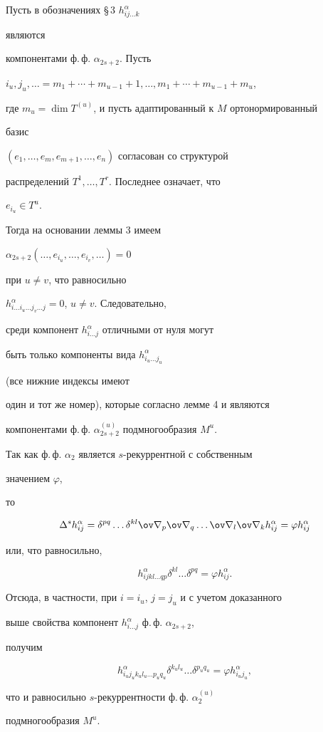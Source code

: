\begin{pf} Пусть в обозначениях \S\,3\; $h^\alpha_{i j\dots k}$


являются


компонентами ф.\,ф. $\alpha_{2s+2}$. Пусть


$i_u,j_u,\dotsc=m_1+\dotsb+m_{u-1}+1,\dotsc,m_1+\dotsb+


m_{u-1}+m_u$,


где $m_u=\dim T^{(u)}$, и пусть адаптированный к $M$ ортонормированный


базис


$(e_1,\dotsc,e_m,e_{m+1},\dotsc,e_n)$ согласован со структурой


распределений $T^1,\dotsc,T^r$. Последнее означает, что


$e_{i_u}\in T^u$.


Тогда на основании леммы 3 имеем


$\alpha_{2s+2}(\dotsc,e_{i_u},\dotsc,e_{i_v},\dotsc)=0$


при $u\ne v$, что равносильно


$h^\alpha_{i\dots i_u\dots j_v\dots j}=0$, $u\ne v$. Следовательно,


среди компонент $h^\alpha_{i\dots j}$ отличными от нуля могут


быть только компоненты вида $h^\alpha_{i_u\dots j_u}$


(все нижние индексы имеют


один и тот же номер), которые согласно лемме 4 и являются


компонентами ф.\,ф. $\alpha^{(u)}_{2s+2}$ подмногообразия $M^u$.


Так как ф.\,ф. $\alpha_2$ является $s$-рекуррентной с собственным


значением $\varphi$,


то


$$


\Delta^s h^\alpha_{ij}=\delta^{pq}\dots\delta^{kl}


\ov\nabla_p\ov\nabla_q\dots\ov\nabla_l\ov\nabla_k


h^\alpha_{ij}=\varphi h^\alpha_{ij}


$$


или, что равносильно,


$$


h^\alpha_{i j k l\dots q p}\delta^{kl}\dots\delta^{pq}=


\varphi h^\alpha_{ij}.


$$


Отсюда, в частности, при $i=i_u$, $j=j_u$ и с учетом доказанного


выше свойства компонент $h^\alpha_{i\dots j}$ ф.\,ф. $\alpha_{2s+2}$,


получим


$$


h^\alpha_{i_u j_u k_u l_u\dots p_u q_u}


\delta^{k_u l_u}\dots\delta^{p_u q_u}=\varphi h^\alpha_{i_u j_u},


$$


что и равносильно $s$-рекуррентности ф.\,ф. $\alpha^{(u)}_2$


подмногообразия $M^u$.


\end{pf}
